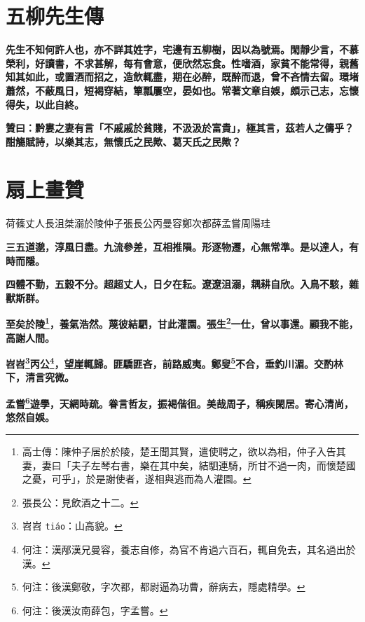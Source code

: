 \section{五柳先生傳}

\textbf{先生不知何許人也，亦不詳其姓字，宅邊有五柳樹，因以為號焉。閑靜少言，不慕榮利，好讀書，不求甚解，每有會意，便欣然忘食。性嗜酒，家貧不能常得，親舊知其如此，或置酒而招之，造飲輒盡，期在必醉，既醉而退，曾不吝情去留。環堵蕭然，不蔽風日，短褐穿結，簞瓢屢空，晏如也。常著文章自娛，頗示己志，忘懷得失，以此自終。}

\textbf{贊曰：黔婁之妻有言「不戚戚於貧賤，不汲汲於富貴」，極其言，茲若人之儔乎？酣觴賦詩，以樂其志，無懷氏之民歟、葛天氏之民歟？}

\section{扇上畫贊}

\begin{quoting}荷蓧丈人\hspace{1ex}長沮桀溺\hspace{1ex}於陵仲子\hspace{1ex}張長公\hspace{1ex}丙曼容\hspace{1ex}鄭次都\hspace{1ex}薛孟嘗\hspace{1ex}周陽珪\end{quoting}

\textbf{三五道邈，淳風日盡。九流參差，互相推隕。形逐物遷，心無常準。是以達人，有時而隱。}

\textbf{四體不勤，五穀不分。超超丈人，日夕在耘。遼遼沮溺，耦耕自欣。入鳥不駭，雜獸斯群。}

\textbf{至矣於陵\footnote{高士傳：陳仲子居於於陵，楚王聞其賢，遣使聘之，欲以為相，仲子入告其妻，妻曰「夫子左琴右書，樂在其中矣，結駟連騎，所甘不過一肉，而懷楚國之憂，可乎」，於是謝使者，遂相與逃而為人灌園。}，養氣浩然。蔑彼結駟，甘此灌園。張生\footnote{張長公：見飲酒之十二。}一仕，曾以事還。顧我不能，高謝人間。}

\textbf{岧岧\footnote{岧岧 \texttt{tiáo}：山高貌。}丙公\footnote{何注：漢邴漢兄曼容，養志自修，為官不肯過六百石，輒自免去，其名過出於漢。}，望崖輒歸。匪驕匪吝，前路威夷。鄭叟\footnote{何注：後漢鄭敬，字次都，都尉逼為功曹，辭病去，隱處精學。}不合，垂釣川湄。交酌林下，清言究微。}

\textbf{孟嘗\footnote{何注：後漢汝南薛包，字孟嘗。}遊學，天網時疏。眷言哲友，振褐偕徂。美哉周子，稱疾閑居。寄心清尚，悠然自娛。}

